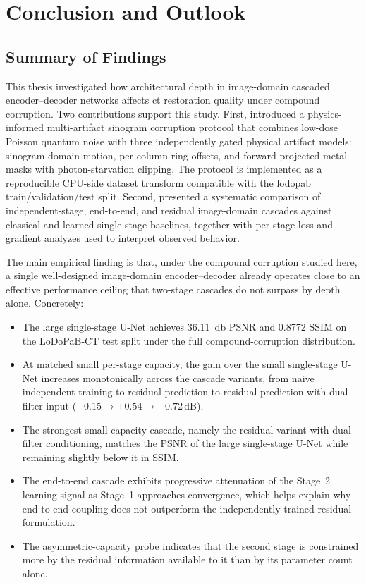 \chapter{Conclusion and Outlook}
\label{chap:conclusion}

\section{Summary of Findings}
\label{sec:conc_summary}

This thesis investigated how architectural depth in image-domain cascaded encoder--decoder networks affects \gls{ct} restoration quality under compound corruption. Two contributions support this study. First,  introduced a physics-informed multi-artifact sinogram corruption protocol that combines low-dose Poisson quantum noise with three independently gated physical artifact models: sinogram-domain motion, per-column ring offsets, and forward-projected metal masks with photon-starvation clipping. The protocol is implemented as a reproducible CPU-side dataset transform compatible with the \gls{lodopab} train/validation/test split. Second,  presented a systematic comparison of independent-stage, end-to-end, and residual image-domain cascades against classical and learned single-stage baselines, together with per-stage loss and gradient analyzes used to interpret observed behavior.

The main empirical finding is that, under the compound corruption studied here, a single well-designed image-domain encoder--decoder already operates close to an effective performance ceiling that two-stage cascades do not surpass by depth alone. Concretely:

\begin{itemize}
    \item The large single-stage U-Net achieves \SI{36.11}{\decibel} PSNR and \num{0.8772} SSIM on the LoDoPaB-CT test split under the full compound-corruption distribution.
    \item At matched small per-stage capacity, the gain over the small single-stage U-Net increases monotonically across the cascade variants, from naive independent training to residual prediction to residual prediction with dual-filter input ($+0.15 \to +0.54 \to +0.72$\,dB).
    \item The strongest small-capacity cascade, namely the residual variant with dual-filter conditioning, matches the PSNR of the large single-stage U-Net while remaining slightly below it in SSIM.
    \item The end-to-end cascade exhibits progressive attenuation of the Stage~2 learning signal as Stage~1 approaches convergence, which helps explain why end-to-end coupling does not outperform the independently trained residual formulation.
    \item The asymmetric-capacity probe indicates that the second stage is constrained more by the residual information available to it than by its parameter count alone.
\end{itemize}

